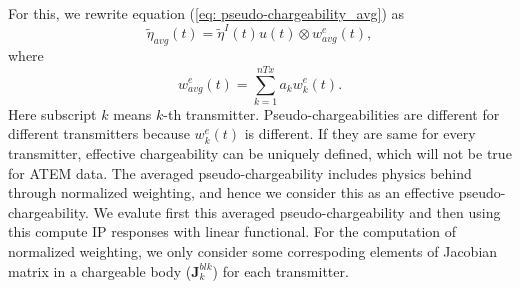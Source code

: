\documentclass[a4paper, 11pt]{article}
\newcommand{\peta}{\tilde{\eta}}
\begin{document}
For this, we rewrite equation (\ref{eq: pseudo-chargeability_avg}) as
\begin{equation}
  \peta_{avg}(t) = \peta^{I}(t)u(t) \otimes w^e_{avg}(t),
  \label{eq: pseudo-chargeability_avg_we}
\end{equation}
where 
\begin{equation}
  w^e_{avg}(t) = \sum_{k=1}^{nTx} a_k w^e_{k}(t).
  \label{eq: we_avg}
\end{equation}
Here subscript $k$ means $k$-th transmitter. 
Pseudo-chargeabilities are different for different transmitters because $w^e_k(t)$ is different. 
If they are same for every transmitter, effective chargeability can be uniquely defined, which will not be true for ATEM data. 
The averaged pseudo-chargeability includes physics behind through normalized weighting, and hence we consider this as an effective pseudo-chargeability. 
We evalute first this averaged pseudo-chargeability and then using this compute IP responses with linear functional. 
For the computation of normalized weighting, we only consider some correspoding elements of Jacobian matrix in a chargeable body ($\mathbf{J}^{blk}_k$) for each transmitter. 
\end{document}
